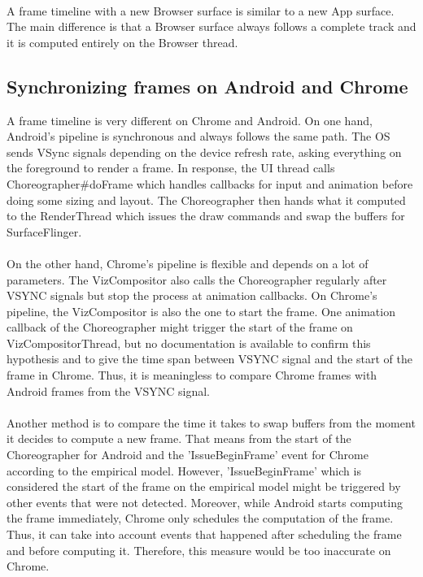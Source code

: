 \documentclass{kththesis}
\begin{document}
\paragraph{}
A frame timeline with a new Browser surface is similar to a new App surface. The main difference is that a Browser surface always follows a complete track and it is computed entirely on the Browser thread.

\subsection{Synchronizing frames on Android and Chrome}
\label{soundness:metric}

A frame timeline is very different on Chrome and Android. 
On one hand, Android's pipeline is synchronous and always follows the same path. The OS sends VSync signals depending on the device refresh rate, asking everything on the foreground to render a frame. In response, the UI thread calls Choreographer\#doFrame which handles callbacks for input and animation before doing some sizing and layout. The Choreographer then hands what it computed to the RenderThread which issues the draw commands and swap the buffers for SurfaceFlinger.

\paragraph{}
 On the other hand, Chrome's pipeline is flexible and depends on a lot of parameters. The VizCompositor also calls the Choreographer regularly after VSYNC signals but stop the process at animation callbacks. On Chrome's pipeline, the VizCompositor is also the one to start the frame. One animation callback of the Choreographer might trigger the start of the frame on VizCompositorThread, but no documentation is available to confirm this hypothesis and to give the time span between VSYNC signal and the start of the frame in Chrome. \newline
Thus, it is meaningless to compare Chrome frames with Android frames from the VSYNC signal.

\paragraph{}
Another method is to compare the time it takes to swap buffers from the moment it decides to compute a new frame. That means from the start of the Choreographer for Android and the 'IssueBeginFrame' event for Chrome according to the empirical model. However, 'IssueBeginFrame' which is considered the start of the frame on the empirical model might be triggered by other events that were not detected. Moreover, while Android starts computing the frame immediately, Chrome only schedules the computation of the frame. Thus, it can take into account events that happened after scheduling the frame and before computing it.  
Therefore, this measure would be too inaccurate on Chrome. \newline
\end{document}
